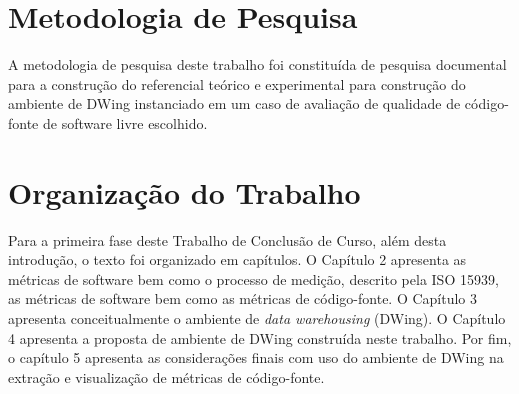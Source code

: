 
\section {Metodologia de Pesquisa}

A metodologia de pesquisa deste trabalho foi constituída de pesquisa documental para a construção do referencial teórico e experimental para construção do ambiente de DWing instanciado em um caso de avaliação de qualidade de código-fonte de software livre escolhido. 

\section{Organização do Trabalho}

Para a primeira fase deste Trabalho de Conclusão de Curso, além desta 
introdução, o texto foi organizado em capítulos. O Capítulo 2 apresenta as 
métricas de software bem como o processo de medição, descrito pela ISO 15939, 
as métricas de software bem como as métricas de código-fonte. O Capítulo 3 
apresenta conceitualmente o ambiente de \textit{data warehousing} (DWing). O 
Capítulo 4 apresenta a proposta de ambiente de DWing construída neste 
trabalho. Por fim, o capítulo 5 apresenta as considerações finais com uso do 
ambiente de DWing na extração e visualização de métricas de código-fonte. 
